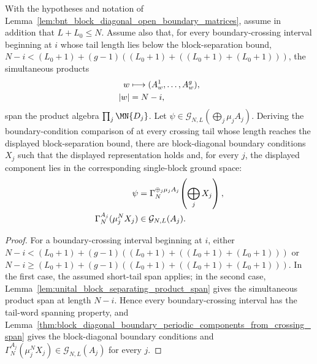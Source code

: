 \begin{lemma}
    \label{thm:block_diagonal_boundary_periodic_components_from_short_crossing_span}
    \leanok
    With the hypotheses and notation of
    Lemma~\ref{lem:bnt_block_diagonal_open_boundary_matrices}, assume in
    addition that $L+L_0\le N$. Assume also that, for every boundary-crossing
    interval beginning at $i$ whose tail length lies below the
    block-separation bound,
    $N-i < (L_0+1) +(g-1)((L_0+1)+((L_0+1)+(L_0+1)))$,
    the simultaneous products
    \begin{align}
        w   & \longmapsto (A^1_w,\ldots,A^g_w),
        \notag                                  \\
        |w| & =N-i,
        \notag
    \end{align}
    span the product algebra $\prod_j\MN{D_j}$. Let
    $\psi\in\mathcal G_{N,L}(\bigoplus_j\mu_jA_j)$. Deriving the
    boundary-condition comparison of
    \cite[Theorem~12, proof lines~1446--1456]{PerezGarcia2007Matrix} at every
    crossing tail whose length reaches the displayed block-separation bound,
    there are block-diagonal boundary conditions $X_j$ such that the displayed
    representation holds and, for every $j$, the displayed component lies in
    the corresponding single-block ground space:
    \begin{align}
        \psi
         & =
        \Gamma_N^{\oplus_j\mu_jA_j}\!\left(\bigoplus_jX_j\right),
        \notag                       \\
        \Gamma_N^{A_j}(\mu_j^NX_j)
         & \in\mathcal G_{N,L}(A_j).
        \notag
    \end{align}
\end{lemma}

\begin{proof}
    \leanok
    For a boundary-crossing interval beginning at $i$, either
    $N-i < (L_0+1) +(g-1)((L_0+1)+((L_0+1)+(L_0+1)))$
    or
    $N-i \ge (L_0+1) +(g-1)((L_0+1)+((L_0+1)+(L_0+1)))$.
    In the first case, the assumed short-tail span applies; in the second case,
    Lemma~\ref{lem:unital_block_separating_product_span} gives the
    simultaneous product span at length $N-i$. Hence every boundary-crossing
    interval has the tail-word spanning property, and
    Lemma~\ref{thm:block_diagonal_boundary_periodic_components_from_crossing_span}
    gives the block-diagonal boundary conditions and
    $\Gamma_N^{A_j}(\mu_j^NX_j)\in\mathcal G_{N,L}(A_j)$ for every $j$.
\end{proof}

